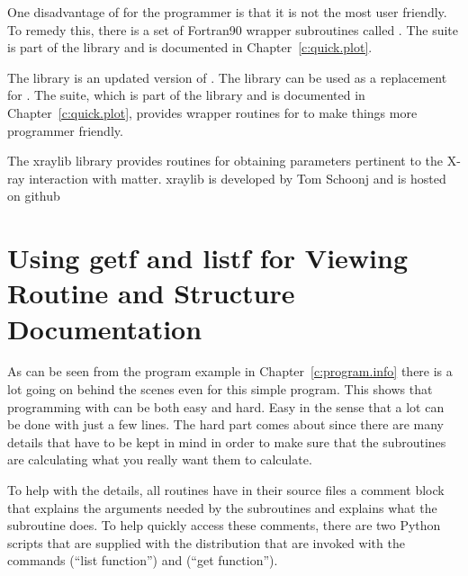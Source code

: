 {{{{{{\begin{description}
One disadvantage of  for the programmer is that it is not the most user friendly. To
remedy this, there is a set of Fortran90 wrapper subroutines called .  The
 suite is part of the  library and is documented in
Chapter~\ref{c:quick.plot}.
%
  \item[plplot] \Newline
The  library is an updated version of . The  library can be used as
a replacement for . The  suite, which is part of the 
library and is documented in Chapter~\ref{c:quick.plot}, provides wrapper routines for 
to make things more programmer friendly.
%
  \item[xraylib] \Newline
The xraylib library provides routines for obtaining parameters pertinent to the X-ray interaction
with matter. xraylib is developed by Tom Schoonj and is hosted on github\cite{b:xraylib}

\end{description}

\section{Using getf and listf for Viewing Routine and Structure Documentation}
\label{s:getf}

As can be seen from the program example in Chapter~\ref{c:program.info}
there is a lot going on behind the scenes even for this
simple program. This shows that programming with \bmad can be both easy
and hard. Easy in the sense that a lot can be done with just a few
lines. The hard part comes about since there are many details that
have to be kept in mind in order to make sure that the subroutines
are calculating what you really want them to calculate.

To help with the details, all \bmad routines have in their source
files a comment block that explains the arguments needed by the
subroutines and explains what the subroutine does. To help quickly
access these comments, there are two Python scripts that are supplied
with the \bmad distribution that are invoked with the commands
 (``list function'') and  (``get function'').

}}}}}}
